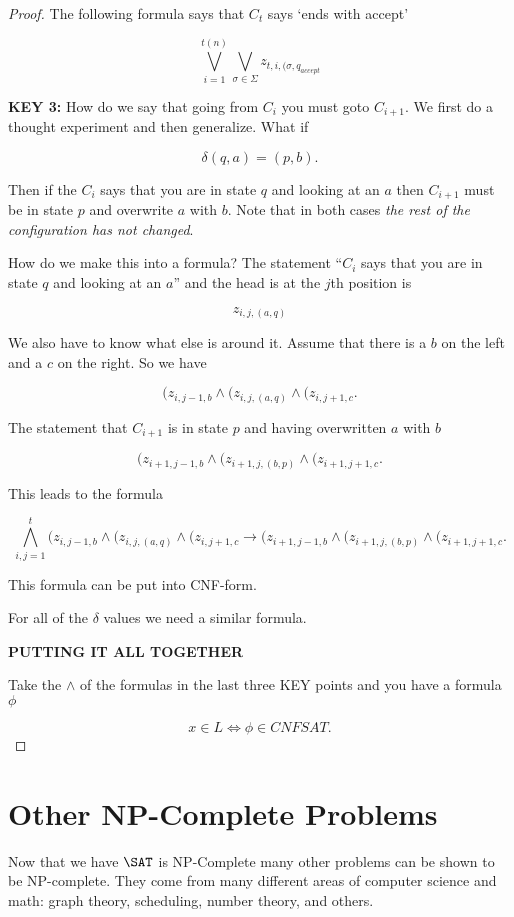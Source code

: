 \documentclass[12pt]{article}
\begin{document}
\begin{proof}
The following formula says that $C_t$ says `ends with accept'

$$\bigvee_{i=1}^{t(n)} \bigvee_{\sigma\in\Sigma}  z_{t,i,(\sigma,q_{accept}}$$



\noindent
{\bf KEY 3:} How do we say that going from $C_i$ you must goto $C_{i+1}$.
We first do a thought experiment and then generalize.
What if 

$$\delta(q,a) = (p,b).$$

Then if the $C_i$ says that you are in state $q$ and looking at
an $a$ then $C_{i+1}$ must be in state $p$ and overwrite $a$ with $b$.
Note that in both cases {\it the rest of the configuration has not changed}.

How do we make this into a formula?
The statement ``$C_i$ says that you are in state $q$ and looking at
an $a$'' and the head is at the $j$th position is

$$z_{i,j,(a,q)}$$

We also have to know what else is around it. Assume that there is a $b$ on the left and a $c$ on the right.
So we have

$$(z_{i,j-1,b} \wedge (z_{i,j,(a,q)}\wedge (z_{i,j+1,c}.$$

The statement that $C_{i+1}$ is 
in state $p$ and having overwritten $a$ with $b$

$$(z_{i+1,j-1,b} \wedge (z_{i+1,j,(b,p)}\wedge (z_{i+1,j+1,c}.$$

This leads to the formula


$$
\bigwedge_{i,j=1}^t 
(z_{i,j-1,b} \wedge (z_{i,j,(a,q)}\wedge (z_{i,j+1,c} \rightarrow
(z_{i+1,j-1,b} \wedge (z_{i+1,j,(b,p)}\wedge (z_{i+1,j+1,c}.
$$

This formula can be put into CNF-form.

For all of the $\delta$ values we need a similar formula.

\noindent
{\bf PUTTING IT ALL TOGETHER}

Take the $\wedge$ of the formulas in the last three
KEY points and you have a formula $\phi$

$$x\in L \iff \phi \in CNFSAT.$$
\end{proof}

\section{Other NP-Complete Problems}

Now that we have $\SAT$ is NP-Complete many other
problems can be shown to be NP-complete.
They come from many different areas of computer science
and math: graph theory, scheduling, number theory, and others.
\end{document}
